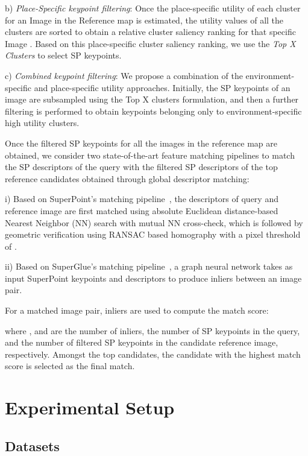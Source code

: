 \documentclass[letterpaper, 10 pt, conference]{ieeeconf}  \fi
\begin{document}
b) \textit{Place-Specific keypoint filtering}: Once the place-specific utility of each cluster for an Image  in the Reference map  is estimated, the utility values of all the clusters are sorted to obtain a relative cluster saliency ranking for that specific Image . Based on this place-specific cluster saliency ranking, we use the \textit{Top X Clusters} to select SP keypoints.

c) \textit{Combined keypoint filtering}: We propose a combination of the environment-specific and place-specific utility approaches. Initially, the SP keypoints of an image are subsampled using the Top X clusters formulation, and then a further filtering is performed to obtain keypoints belonging only to environment-specific high utility clusters.

Once the filtered SP keypoints for all the images in the reference map are obtained, we consider two state-of-the-art feature matching pipelines to match the SP descriptors of the query with the filtered SP descriptors of the top  reference candidates obtained through global descriptor matching:

i) Based on SuperPoint's matching pipeline~\cite{detone2018superpoint}, the descriptors of query and reference image are first matched using absolute Euclidean distance-based Nearest Neighbor (NN) search with mutual NN cross-check, which is followed by geometric verification using RANSAC based homography with a pixel threshold of .

ii) Based on SuperGlue's matching pipeline~\cite{sarlin2020superglue}, a graph neural network takes as input SuperPoint keypoints and descriptors to produce inliers between an image pair.

For a matched image pair, inliers are used to compute the match score:



where ,  and  are the number of inliers, the number of SP keypoints in the query, and the number of filtered SP keypoints in the candidate reference image, respectively. Amongst the top  candidates, the candidate with the highest match score is selected as the final match.

\section{Experimental Setup}

\subsection{Datasets}
\label{sec:datasets}
\end{document}

